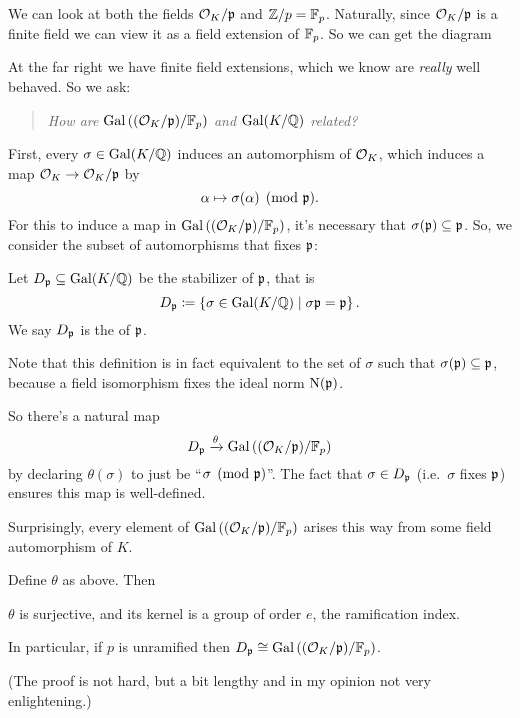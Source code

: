 We can look at both the fields $\mathcal O_K / \mathfrak p$ and $\mathbb Z / p = \mathbb F_p$.
Naturally, since $\mathcal O_K / \mathfrak p$ is a finite field we can view it as a field extension of $\mathbb F_p$.
So we can get the diagram
\begin{center}
\end{center}
At the far right we have finite field extensions, which we know are \emph{really} well behaved.
So we ask:
\begin{quote}
	\itshape
	How are $\operatorname{Gal}\left( (\mathcal O_K/\mathfrak p) / \mathbb F_p \right)$
	and $\operatorname{Gal}(K/\mathbb Q)$ related?
\end{quote}

First, every $\sigma \in \operatorname{Gal}(K/\mathbb Q)$ induces an automorphism of $\mathcal O_K$, which induces a map
$\mathcal O_K \to \mathcal O_K/\mathfrak p$ by
\[ \alpha \mapsto \sigma(\alpha) \pmod{\mathfrak p}. \]
For this to induce a map in $\operatorname{Gal}\left( (\mathcal O_K/\mathfrak p) / \mathbb F_p \right)$, it's necessary that $\sigma(\mathfrak p) \subseteq \mathfrak p$. So, we consider the subset of automorphisms that fixes $\mathfrak p$:
\begin{definition}
	Let $D_\mathfrak p \subseteq \operatorname{Gal}(K/\mathbb Q)$ be the stabilizer of $\mathfrak p$, that is
	\[ D_\mathfrak p \coloneqq \left\{ \sigma \in \operatorname{Gal}(K/\mathbb Q) \mid \sigma\mathfrak p = \mathfrak p \right\}. \]
	We say $D_\mathfrak p$ is the  of $\mathfrak p$.
\end{definition}
Note that this definition is in fact equivalent to the set of $\sigma$ such that $\sigma(\mathfrak p) \subseteq \mathfrak p$,
because a field isomorphism fixes the ideal norm $\operatorname{N}(\mathfrak p)$.

So there's a natural map
\[ D_\mathfrak p \xrightarrow{\theta} \operatorname{Gal}\left( (\mathcal O_K/\mathfrak p) / \mathbb F_p \right) \]
by declaring $\theta(\sigma)$ to just be ``$\sigma \pmod {\mathfrak p}$''.
The fact that $\sigma \in D_\mathfrak p$ (i.e.\ $\sigma$ fixes $\mathfrak p$)
ensures this map is well-defined.

Surprisingly, every element of $\operatorname{Gal}\left( (\mathcal O_K/\mathfrak p) / \mathbb F_p \right)$ arises this way from some field automorphism of $K$.

\begin{theorem}
	\label{thm:decomposition}
	Define $\theta$ as above. Then
	\begin{itemize}
		\ii $\theta$ is surjective, and
		\ii its kernel is a group of order $e$,
		the ramification index.
	\end{itemize}
	In particular, if $p$ is unramified then
	$D_\mathfrak p \cong \operatorname{Gal}\left( (\mathcal O_K/\mathfrak p)/\mathbb F_p \right)$.
\end{theorem}
(The proof is not hard, but a bit lengthy and in my opinion
not very enlightening.)

